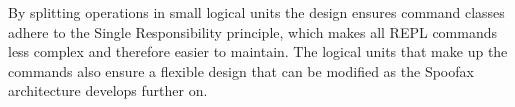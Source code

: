 By splitting operations in small logical units the design ensures command
classes adhere to the Single Responsibility principle, which makes all REPL
commands less complex and therefore easier to maintain. The logical units that
make up the commands also ensure a flexible design that can be modified
as the Spoofax architecture develops further on.

%
%

